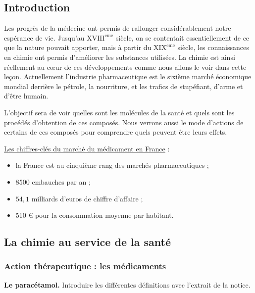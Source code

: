 \subsection*{Introduction}

Les progrès de la médecine ont permis de rallonger considérablement notre espérance de vie.
Jusqu'au $\mathrm{XVIII^{eme}}$ siècle, on se contentait essentiellement de ce que la nature pouvait apporter, mais à partir du $\mathrm{XIX^{eme}}$ siècle, les connaissances en chimie ont permis d'améliorer les substances utilisées.
La chimie est ainsi réellement au cœur de ces développements comme nous allons le voir dans cette leçon.
Actuellement l'industrie pharmaceutique est le sixième marché économique mondial derrière le pétrole, la nourriture, et les trafics de stupéfiant, d'arme et d'être humain.

L'objectif sera de voir quelles sont les molécules de la santé et quels sont les procédés d'obtention de ces composés.
Nous verrons aussi le mode d'actions de certains de ces composés pour comprendre quels peuvent être leurs effets.

\begin{remarque}
\href{http://www.guidepharmasante.fr/chiffres-cles/les-chiffres-cles-du-marche-du-medicament-1}{Les chiffres-clés du marché du médicament en France} :
\begin{itemize}
\item la France est au cinquième rang des marchés pharmaceutiques ;
\item 8500 embauches par an ;
\item $54{,}1$ milliards d'euros de chiffre d'affaire ;
\item 510 \euro{} pour la consommation moyenne par habitant.
\end{itemize}
\end{remarque}

\subsection{La chimie au service de la santé}

\subsubsection{Action thérapeutique : les médicaments}

\begin{slide}
\textbf{Le paracétamol.}
Introduire les différentes définitions avec l'extrait de la notice.
\end{slide}


